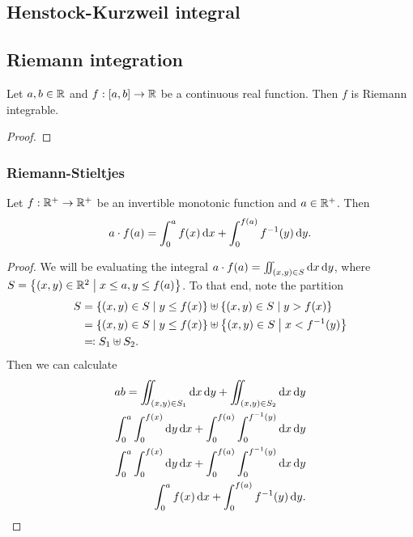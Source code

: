 \subsection{Henstock-Kurzweil integral}

\subsection{Riemann integration}
\begin{lemma}
Let $a,b\in \mathbb{R}$ and $f:\interval{a,b}\to \R$ be a continuous real function. Then $f$ is Riemann integrable.
\end{lemma}
\begin{proof}

\end{proof}
\subsubsection{Riemann-Stieltjes}

\begin{lemma} \label{rectanglePartitionedByMonotonicFunction}
Let $f: \mathbb{R}^+ \to \mathbb{R}^+$ be an invertible monotonic function and $a\in\mathbb{R}^+$. Then
\[ a\cdot f(a) = \int_0^a f(x)\operatorname{d \!}{x} + \int_0^{f(a)} f^{-1}(y)\operatorname{d \!}{y}. \]
\end{lemma}
\begin{proof}
We will be evaluating the integral $a\cdot f(a) = \iint_{(x,y)\in S}\operatorname{d \!}{x}\operatorname{d \!}{y}$, where $S = \setbuilder{(x,y)\in \R^2}{x\leq a, y\leq f(a)}$. To that end, note the partition
\begin{align*}
S &= \setbuilder{(x,y)\in S}{y\leq f(x)} \uplus \setbuilder{(x,y)\in S}{y > f(x)} \\
&= \setbuilder{(x,y)\in S}{y\leq f(x)} \uplus \setbuilder{(x,y)\in S}{x < f^{-1}(y)} \\
&\eqdef S_1 \uplus S_2.
\end{align*}
Then we can calculate
\begin{align*}
ab = \iint_{(x,y)\in S_1}\diff{x}\diff{y} + \iint_{(x,y)\in S_2}\diff{x}\diff{y} \\
\int_0^a\int_0^{f(x)}\diff{y}\diff{x} + \int_0^{f(a)}\int_0^{f^{-1}(y)}\diff{x}\diff{y} \\
\int_0^a\int_0^{f(x)}\diff{y}\diff{x} + \int_0^{f(a)}\int_0^{f^{-1}(y)}\diff{x}\diff{y} \\
\int_0^a f(x)\diff{x} + \int_0^{f(a)} f^{-1}(y)\diff{y}.
\end{align*}
\end{proof}



